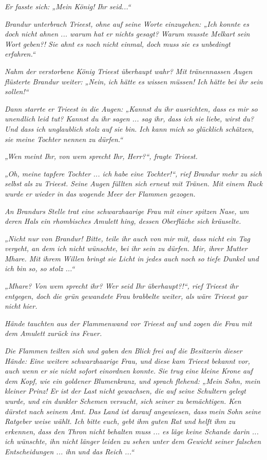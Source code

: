\textit{Er fasste sich: „Mein König! Ihr seid...“}

\textit{Brandur unterbrach Trieest, ohne auf seine Worte einzugehen: „Ich konnte es doch nicht ahnen ... warum hat er nichts gesagt? Warum musste Melkart sein Wort geben?! Sie ahnt es noch nicht einmal, doch muss sie es unbedingt erfahren.“}

\textit{Nahm der verstorbene König Trieest überhaupt wahr? Mit tränennassen Augen flüsterte Brandur weiter: „Nein, ich hätte es wissen müssen! Ich hätte bei ihr sein sollen!“}

\textit{Dann starrte er Trieest in die Augen: „Kannst du ihr ausrichten, dass es mir so unendlich leid tut? Kannst du ihr sagen ... sag ihr, dass ich sie liebe, wirst du? Und dass ich unglaublich stolz auf sie bin. Ich kann mich so glücklich schätzen, sie meine Tochter nennen zu dürfen.“}

\textit{„Wen meint Ihr, von wem sprecht Ihr, Herr?“, fragte Trieest.}

\textit{„Oh, meine tapfere Tochter ... ich habe eine Tochter!“, rief Brandur mehr zu sich selbst als zu Trieest. Seine Augen füllten sich erneut mit Tränen. Mit einem Ruck wurde er wieder in das wogende Meer der Flammen gezogen.}

\textit{An Brandurs Stelle trat eine schwarzhaarige Frau mit einer spitzen Nase, um deren Hals ein rhombisches Amulett hing, dessen Oberfläche sich kräuselte.}

\textit{„Nicht nur von Brandur! Bitte, teile ihr auch von mir mit, dass nicht ein Tag vergeht, an dem ich nicht wünschte, bei ihr sein zu dürfen. Mir, ihrer Mutter Mhare. Mit ihrem Willen bringt sie Licht in jedes auch noch so tiefe Dunkel und ich bin so, so stolz ...“}

\textit{„Mhare? Von wem sprecht ihr? Wer seid Ihr überhaupt?!“, rief Trieest ihr entgegen, doch die grün gewandete Frau brabbelte weiter, als wäre Trieest gar nicht hier.}

\textit{Hände tauchten aus der Flammenwand vor Trieest auf und zogen die Frau mit dem Amulett zurück ins Feuer.}

\textit{Die Flammen teilten sich und gaben den Blick frei auf die Besitzerin dieser Hände: Eine weitere schwarzhaarige Frau, und diese kam Trieest bekannt vor, auch wenn er sie nicht sofort einordnen konnte. Sie trug eine kleine Krone auf dem Kopf, wie ein goldener Blumenkranz, und sprach flehend: „Mein Sohn, mein kleiner Prinz! Er ist der Last nicht gewachsen, die auf seine Schultern gelegt wurde, und ein dunkler Schemen versucht, sich seiner zu bemächtigen. Ken dürstet nach seinem Amt. Das Land ist darauf angewiesen, dass mein Sohn seine Ratgeber weise wählt. Ich bitte euch, gebt ihm guten Rat und helft ihm zu erkennen, dass den Thron nicht behalten muss ... es läge keine Schande darin ... ich wünschte, ihn nicht länger leiden zu sehen unter dem Gewicht seiner falschen Entscheidungen ... ihn und das Reich ...“}


